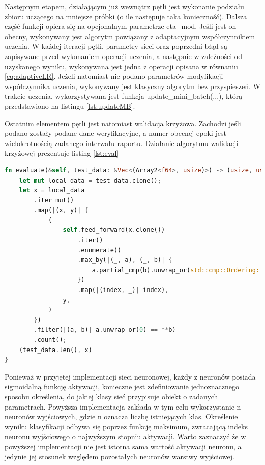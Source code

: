 \documentclass[12pt,twoside]{article}
\begin{document}
Następnym etapem, działającym już wewnątrz pętli jest wykonanie  podziału zbioru uczącego na mniejsze próbki (o ile następuje taka konieczność).
Dalsza część funkcji opiera się na opcjonalnym parametrze eta\_mod.
Jeśli jest on obecny, wykonywany jest algorytm powiązany z adaptacyjnym współczynnikiem uczenia.
W każdej iteracji pętli, parametry sieci oraz poprzedni błąd są zapisywane przed wykonaniem operacji uczenia, a następnie w zależności od uzyskanego wyniku, wykonywana jest jedna z operacji opisana w równaniu \ref{eq:adaptiveLR}.
Jeżeli natomiast nie podano parametrów modyfikacji współczynnika uczenia, wykonywany jest klasyczny algorytm bez przyspieszeń.
W trakcie uczenia, wykorzystywana jest funkcja update\_mini\_batch(...), którą przedstawiono na listingu \ref{lst:updateMB}.

Ostatnim elementem pętli jest natomiast walidacja krzyżowa.
Zachodzi jeśli podano zostały podane dane weryfikacyjne, a numer obecnej epoki jest wielokrotnością zadanego interwału raportu.
Działanie algorytmu walidacji krzyżowej prezentuje listing \ref{lst:eval}

\begin{lstlisting}[language=Rust,caption=Realizacja funkcji walidacji krzyżowej,label={lst:eval}]
fn evaluate(&self, test_data: &Vec<(Array2<f64>, usize)>) -> (usize, usize) {
	let mut local_data = test_data.clone();
	let x = local_data
		.iter_mut()
		.map(|(x, y)| {
			(
				self.feed_forward(x.clone())
					.iter()
					.enumerate()
					.max_by(|(_, a), (_, b)| {
						a.partial_cmp(b).unwrap_or(std::cmp::Ordering::Equal)
					})
					.map(|(index, _)| index),
				y,
			)
		})
		.filter(|(a, b)| a.unwrap_or(0) == **b)
		.count();
	(test_data.len(), x)
}
\end{lstlisting}
Ponieważ w przyjętej implementacji sieci neuronowej, każdy z neuronów posiada sigmoidalną funkcję aktywacji, konieczne jest zdefiniowanie jednoznacznego sposobu określenia, do jakiej klasy sieć przypisuje obiekt o zadanych parametrach.
Powyższa implementacja zakłada w tym celu wykorzystanie n neuronów wyjściowych, gdzie n oznacza liczbę istniejących klas.
Określenie wyniku klasyfikacji odbywa się poprzez funkcję maksimum, zwracającą indeks neuronu wyjściowego o najwyższym stopniu aktywacji.
Warto zaznaczyć że w powyższej implementacji nie jest istotna sama wartość aktywacji neuronu, a jedynie jej stosunek względem pozostałych neuronów warstwy wyjściowej.
\end{document}

